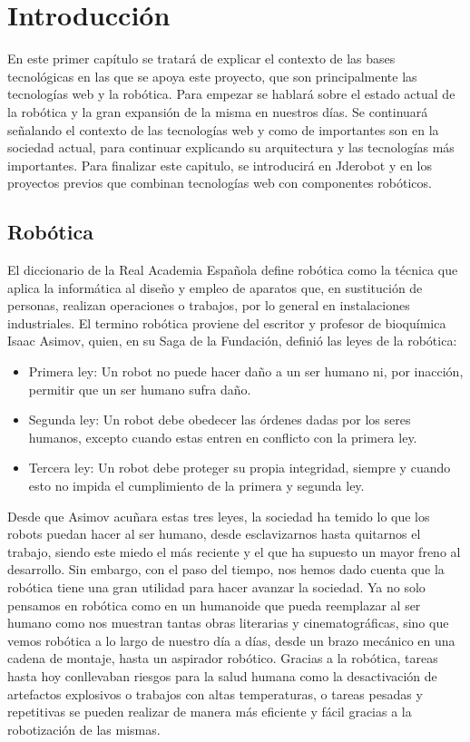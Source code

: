 \chapter{Introducción}\label{cap.introduccion}
En este primer capítulo se tratará de explicar el contexto de las bases tecnológicas en las que se apoya este proyecto, que son principalmente las tecnologías web y la robótica. Para empezar se hablará sobre el estado actual de la robótica y la gran expansión de la misma en nuestros días. Se continuará señalando el contexto de las tecnologías web y como de importantes son en la sociedad actual, para continuar explicando su arquitectura y las tecnologías más importantes. Para finalizar este capitulo, se introducirá en Jderobot y en los proyectos previos que combinan tecnologías web con componentes robóticos.

\section{Robótica}
El diccionario de la Real Academia Española define robótica como la técnica que aplica la informática al diseño y empleo de aparatos que, en sustitución de personas, realizan operaciones o trabajos, por lo general en instalaciones industriales. El termino robótica proviene del escritor y profesor de bioquímica Isaac Asimov, quien, en su Saga de la Fundación, definió las leyes de la robótica:
\begin{itemize}
	\item Primera ley: Un robot no puede hacer daño a un ser humano ni, por inacción, permitir que un ser humano sufra daño.
	\item Segunda ley: Un robot debe obedecer las órdenes dadas por los seres humanos, excepto cuando estas entren en conflicto con la primera ley.
	\item Tercera ley: Un robot debe proteger su propia integridad, siempre y cuando esto no impida el cumplimiento de la primera y segunda ley.
\end{itemize}
Desde que Asimov acuñara estas tres leyes, la sociedad ha temido lo que los robots puedan hacer al ser humano, desde esclavizarnos hasta quitarnos el trabajo, siendo este miedo el más reciente y el que ha supuesto un mayor freno al desarrollo. Sin embargo, con el paso del tiempo, nos hemos dado cuenta que la robótica tiene una gran utilidad para hacer avanzar la sociedad. Ya no solo pensamos en robótica como en un humanoide que pueda reemplazar al ser humano como nos muestran tantas obras literarias y cinematográficas, sino que vemos robótica a lo largo de nuestro día a días, desde un brazo mecánico en una cadena de montaje, hasta un aspirador robótico. Gracias a la robótica, tareas hasta hoy conllevaban riesgos para la salud humana como la desactivación de artefactos explosivos o trabajos con altas temperaturas, o tareas pesadas y repetitivas se pueden realizar de manera más eficiente y fácil gracias a la robotización de las mismas.

